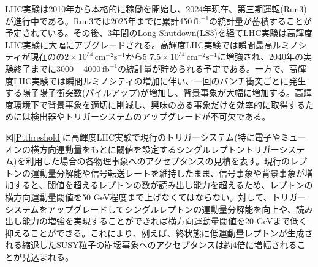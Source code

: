 LHC実験は2010年から本格的に稼働を開始し、2024年現在、第三期運転(Run3)が進行中である。Run3では2025年までに累計450\,$\mathrm{fb}^{-1}$の統計量が蓄積することが予定されている。その後、3年間のLong Shutdown(LS3)を経てLHC実験は高輝度LHC実験に大幅にアプグレードされる。高輝度LHC実験では瞬間最高ルミノシティが現在のの$2\times10^{34}\,\mathrm{cm}^{-2}\mathrm{s}^{-1}$から$5 \text{~} 7.5\times10^{34}\,\mathrm{cm}^{-2}\mathrm{s}^{-1}$に増強され、2040年の実験終了までに3000 ~ 4000\,$\mathrm{fb}^{-1}$の統計量が貯められる予定である。一方で、高輝度LHC実験では瞬間ルミノシティの増加に伴い、一回のバンチ衝突ごとに発生する陽子陽子衝突数(パイルアップ)が増加し、背景事象が大幅に増加する。高輝度環境下で背景事象を適切に削減し、興味のある事象だけを効率的に取得するためには検出器やトリガーシステムのアップグレードが不可欠である。\par

図\ref{Ptthreshold}に高輝度LHC実験で現行のトリガーシステム(特に電子やミューオンの横方向運動量をもとに閾値を設定するシングルレプトントリガーシステム)を利用した場合の各物理事象へのアクセプタンスの見積を表す。現行のレプトンの運動量分解能や信号転送レートを維持したまま、信号事象や背景事象が増加すると、閾値を超えるレプトンの数が読み出し能力を超えるため、レプトンの横方向運動量閾値を50 GeV程度まで上げなくてはならない。対して、トリガーシステムをアップグレードしてシングルレプトンの運動量分解能を向上や、読み出し能力の増強を実現することができれば横方向運動量閾値を20 GeVまで低く抑えることができる。これにより、例えば、終状態に低運動量レプトンが生成される縮退したSUSY粒子の崩壊事象へのアクセプタンスは約4倍に増幅されることが見込まれる。


